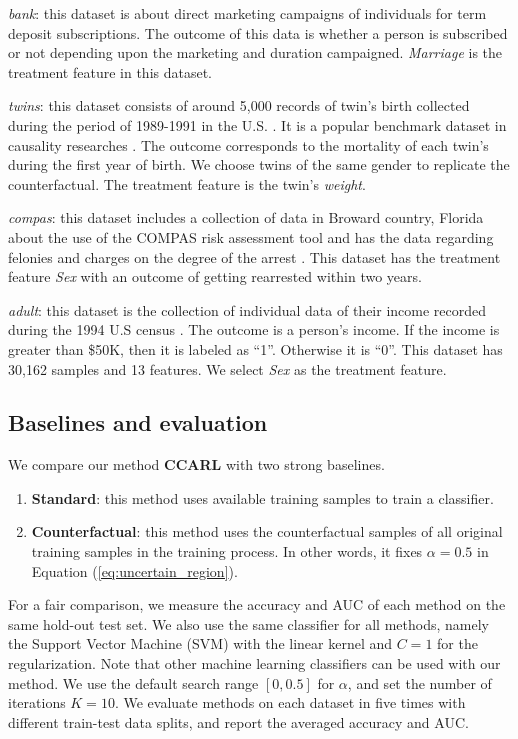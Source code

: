 \textit{bank}: this dataset is about direct marketing campaigns of
individuals for term deposit subscriptions. The outcome of this data
is whether a person is subscribed or not depending upon the marketing
and duration campaigned. \textit{Marriage} is the treatment feature
in this dataset.

\textit{twins}: this dataset consists of around 5,000 records of twin's
birth collected during the period of 1989-1991 in the U.S. \cite{almond2005costs}.
It is a popular benchmark dataset in causality researches \cite{louizos2017causal}.
The outcome corresponds to the mortality of each twin's during the
first year of birth. We choose twins of the same gender to replicate
the counterfactual. The treatment feature is the twin's\textit{ weight}.

\textit{compas}: this dataset includes a collection of data in Broward
country, Florida about the use of the COMPAS risk assessment tool
and has the data regarding felonies and charges on the degree of the
arrest \cite{angwin2016machine}. This dataset has the treatment feature
\textit{Sex} with an outcome of getting rearrested within two years.

\textit{adult}: this dataset is the collection of individual data
of their income recorded during the 1994 U.S census \cite{kamiran2012decision}.
The outcome is a person's income. If the income is greater than \$50K,
then it is labeled as ``1''. Otherwise it is ``0''. This dataset
has 30,162 samples and 13 features. We select \textit{Sex} as the
treatment feature.

\subsection{Baselines and evaluation}

We compare our method \textbf{CCARL} with two strong baselines.
\begin{enumerate}
\item \textbf{Standard}: this method uses available training samples to
train a classifier.
\item \textbf{Counterfactual}: this method uses the counterfactual samples
of all original training samples in the training process. In other
words, it fixes $\alpha=0.5$ in Equation (\ref{eq:uncertain_region}).
\end{enumerate}
For a fair comparison, we measure the accuracy and AUC of each method
on the same hold-out test set. We also use the same classifier for
all methods, namely the Support Vector Machine (SVM) with the linear
kernel and $C=1$ for the regularization. Note that other machine
learning classifiers can be used with our method. We use the default
search range $[0,0.5]$ for $\alpha$, and set the number of iterations
$K=10$. We evaluate methods on each dataset in five times with different
train-test data splits, and report the averaged accuracy and AUC.

